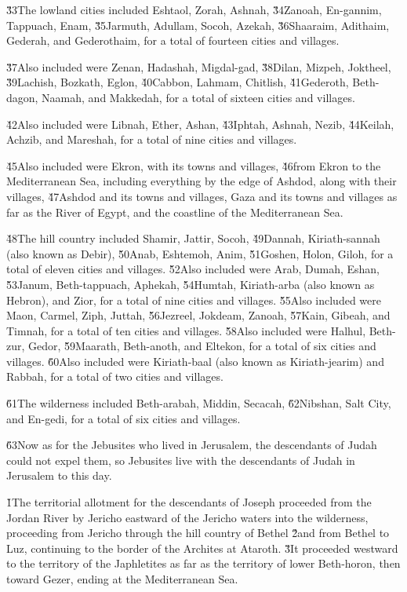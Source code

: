 \v{33}The lowland cities included Eshtaol, Zorah, Ashnah, \v{34}Zanoah, En-gannim, Tappuach, Enam, \v{35}Jarmuth, Adullam, Socoh, Azekah, \v{36}Shaaraim, Adithaim, Gederah, and Gederothaim, for a total of fourteen cities and villages.

\v{37}Also included were Zenan, Hadashah, Migdal-gad, \v{38}Dilan, Mizpeh, Joktheel, \v{39}Lachish, Bozkath, Eglon, \v{40}Cabbon, Lahmam, Chitlish, \v{41}Gederoth, Beth-dagon, Naamah, and Makkedah, for a total of sixteen cities and villages.

\v{42}Also included were Libnah, Ether, Ashan, \v{43}Iphtah, Ashnah, Nezib, \v{44}Keilah, Achzib, and Mareshah, for a total of nine cities and villages.

\v{45}Also included were Ekron, with its towns and villages, \v{46}from Ekron to the Mediterranean Sea, including everything by the edge of Ashdod, along with their villages, \v{47}Ashdod and its towns and villages, Gaza and its towns and villages as far as the River of Egypt, and the coastline of the Mediterranean Sea.

\v{48}The hill country included Shamir, Jattir, Socoh, \v{49}Dannah, Kiriath-sannah (also known as Debir), \v{50}Anab, Eshtemoh, Anim, \v{51}Goshen, Holon, Giloh, for a total of eleven cities and villages. \v{52}Also included were Arab, Dumah, Eshan, \v{53}Janum, Beth-tappuach, Aphekah, \v{54}Humtah, Kiriath-arba (also known as Hebron), and Zior, for a total of nine cities and villages. \v{55}Also included were Maon, Carmel, Ziph, Juttah, \v{56}Jezreel, Jokdeam, Zanoah, \v{57}Kain, Gibeah, and Timnah, for a total of ten cities and villages. \v{58}Also included were Halhul, Beth-zur, Gedor, \v{59}Maarath, Beth-anoth, and Eltekon, for a total of six cities and villages. \v{60}Also included were Kiriath-baal (also known as Kiriath-jearim) and Rabbah, for a total of two cities and villages.

\v{61}The wilderness included Beth-arabah, Middin, Secacah, \v{62}Nibshan, Salt City, and En-gedi, for a total of six cities and villages.

\v{63}Now as for the Jebusites who lived in Jerusalem, the descendants of Judah could not expel them, so Jebusites live with the descendants of Judah in Jerusalem to this day.

\v{1}The territorial allotment for the descendants of Joseph proceeded from the Jordan River by Jericho eastward of the Jericho waters into the wilderness, proceeding from Jericho through the hill country of Bethel \v{2}and from Bethel to Luz, continuing to the border of the Archites at Ataroth. \v{3}It proceeded westward to the territory of the Japhletites as far as the territory of lower Beth-horon, then toward Gezer, ending at the Mediterranean Sea.

